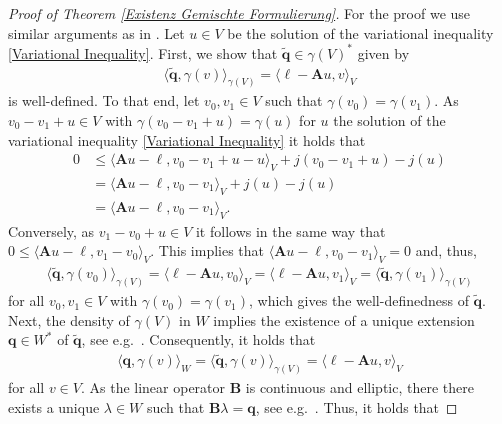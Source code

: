\documentclass[12pt,twoside,reqno]{amsart}
\theoremstyle{definition}
\numberwithin{equation}{section}
\newcommand{\B} {\bm{B}}
\begin{document}
\begin{proof}[Proof of Theorem \ref{Existenz Gemischte Formulierung}] For the proof we use similar arguments as in \cite[Thm.~2.2]{Burg2015}.
    Let $u\in V$ be the solution of the variational inequality \eqref{Variational Inequality}. First, we show that $\tilde{\bm{q}} \in \gamma(V)^*$ given by
        \begin{align*}
            \langle \tilde{\bm{q}}, \gamma(v)\rangle_{\gamma(V)}= \langle\bm{\ell}-\bm{A}u,v\rangle _V
        \end{align*}
    is well-defined. To that end, let $v_0,v_1\in V$ such that $\gamma(v_0)=\gamma(v_1)$.
     As $v_0-v_1+u\in V$ with $\gamma(v_0-v_1+u) = \gamma(u)$ for $u$ the solution of the variational inequality \eqref{Variational Inequality} it holds that
        \begin{align*}
            0&\leq \langle \bm{A}u-\bm{\ell}, v_0-v_1+u-u\rangle_V + j(v_0-v_1+u)-j(u)\\
            &=\langle \bm{A}u-\bm{\ell}, v_0-v_1\rangle_V + j(u) -j(u) \\
            &=\langle \bm{A}u-\bm{\ell}, v_0-v_1\rangle_V.
        \end{align*}
        Conversely, as $v_1-v_0+u\in V$ it follows in the same way that $0\leq\langle \bm{A}u-\bm{\ell}, v_1-v_0\rangle_V.$ This implies that $\langle \bm{A}u-\bm{\ell}, v_0-v_1\rangle_V =0$ and, thus,
        \begin{align*}
            \langle \tilde{\bm{q}}, \gamma(v_0)\rangle_{\gamma(V)}=\langle \bm{\ell}-\bm{A}u,v_0\rangle_V=\langle \bm{\ell}-\bm{A}u,v_1\rangle_V= \langle \tilde{\bm{q}}, \gamma(v_1)\rangle_{\gamma(V)}
        \end{align*}
        for all $v_0,v_1\in V$ with $\gamma(v_0)=\gamma(v_1)$, which gives the well-definedness of $\tilde{\bm{q}}$.\\
        Next, the density of $\gamma(V)$ in $W$ implies the existence of a unique extension $\bm{q}\in W^*$ of $\tilde{\bm{q}}$, see e.g.~\cite[Prop.~5.4]{Stein2011}.
        Consequently, it holds that
        \begin{align*}
            \langle \bm{q}, \gamma(v)\rangle_W = \langle \tilde{\bm{q}}, \gamma(v)\rangle_{\gamma(V)} = \langle\bm{\ell}-\bm{A}u,v\rangle_V
        \end{align*}
        for all $v\in V$. As the linear operator $\B$ is continuous and elliptic, there       
        there exists a unique $\lambda\in W$ such that $\B \lambda = \bm{q}$, see e.g.~\cite[Thm.~5.10]{Han2013}. Thus, it holds that

\end{proof}
\end{document}
